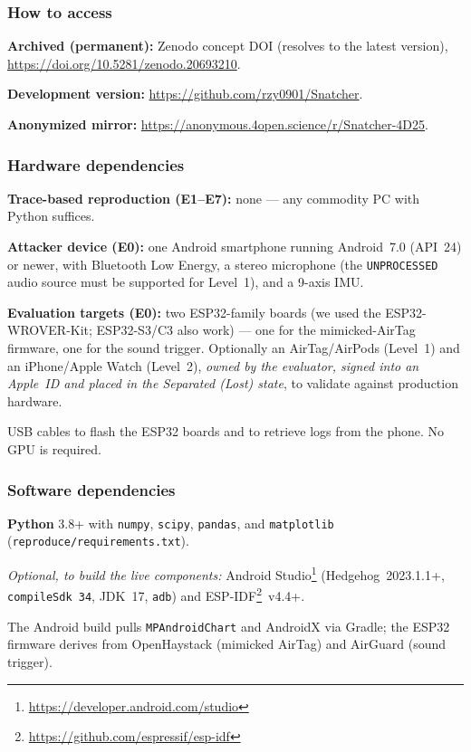 \documentclass[nonacm,sigconf]{acmart}
\begin{document}
\subsubsection{How to access}
\begin{compactitem}
  \item \textbf{Archived (permanent):} Zenodo concept DOI (resolves to the latest
        version), \url{https://doi.org/10.5281/zenodo.20693210}.
  \item \textbf{Development version:} \url{https://github.com/rzy0901/Snatcher}.
  \item \textbf{Anonymized mirror:} \url{https://anonymous.4open.science/r/Snatcher-4D25}.
\end{compactitem}

\subsubsection{Hardware dependencies}
\begin{compactitem}
  \item \textbf{Trace-based reproduction (E1--E7):} none --- any commodity PC
        with Python suffices.
  \item \textbf{Attacker device (E0):} one Android smartphone running
        Android~7.0 (API~24) or newer, with Bluetooth Low Energy, a stereo
        microphone (the \texttt{UNPROCESSED} audio source must be supported for
        Level~1), and a 9-axis IMU.
  \item \textbf{Evaluation targets (E0):} two ESP32-family boards
        (we used the ESP32-WROVER-Kit; ESP32-S3/C3 also work) --- one for the
        mimicked-AirTag firmware, one for the sound trigger. Optionally an
        AirTag/AirPods (Level~1) and an iPhone/Apple Watch (Level~2), \emph{owned
        by the evaluator, signed into an Apple~ID and placed in the Separated
        (Lost) state}, to validate against production hardware.
  \item USB cables to flash the ESP32 boards and to retrieve logs from the phone.
        No GPU is required.
\end{compactitem}

\subsubsection{Software dependencies}
\begin{compactitem}
  \item \textbf{Python} 3.8+ with \texttt{numpy}, \texttt{scipy},
        \texttt{pandas}, and \texttt{matplotlib} (\texttt{reproduce/requirements.txt}).
  \item \emph{Optional, to build the live components:} Android
        Studio\footnote{\url{https://developer.android.com/studio}}
        (Hedgehog~2023.1.1+, \texttt{compileSdk~34}, JDK~17, \texttt{adb}) and
        ESP-IDF\footnote{\url{https://github.com/espressif/esp-idf}}~v4.4+.
  \item The Android build pulls \texttt{MPAndroidChart} and AndroidX via Gradle;
        the ESP32 firmware derives from OpenHaystack (mimicked AirTag) and
        AirGuard (sound trigger).
\end{compactitem}
\end{document}
